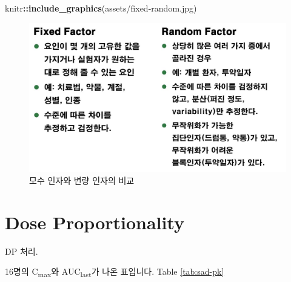 \documentclass[
  12pt,
]{krantz}
\newenvironment{Shaded}{\begin{snugshade}}{\end{snugshade}}
\newcommand{\KeywordTok}[1]{\textcolor[rgb]{0.13,0.29,0.53}{\textbf{#1}}}
\newcommand{\NormalTok}[1]{#1}
\newcommand{\OperatorTok}[1]{\textcolor[rgb]{0.81,0.36,0.00}{\textbf{#1}}}
\newcommand{\StringTok}[1]{\textcolor[rgb]{0.31,0.60,0.02}{#1}}
\begin{document}
\begin{Shaded}
\begin{Highlighting}[]
\NormalTok{knitr}\OperatorTok{::}\KeywordTok{include\_graphics}\NormalTok{(}\StringTok{\textquotesingle{}assets/fixed{-}random.jpg\textquotesingle{}}\NormalTok{)}
\end{Highlighting}
\end{Shaded}

\begin{figure}
\includegraphics[width=1\linewidth]{assets/fixed-random} \caption{모수 인자와 변량 인자의 비교}\label{fig:fixedrandom}
\end{figure}

\hypertarget{dp}{%
\section{Dose Proportionality}\label{dp}}

DP 처리.

16명의 C\textsubscript{max}와 AUC\textsubscript{last}가 나온 표입니다. Table \ref{tab:sad-pk}
\end{document}
